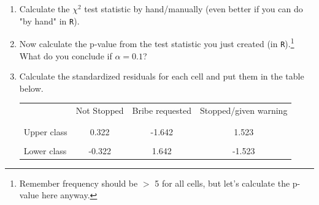 \documentclass[12pt,letterpaper]{article}
\begin{document}
\begin{enumerate}
	
	\item [(a)]
	Calculate the $\chi^2$ test statistic by hand/manually (even better if you can do "by hand" in \texttt{R}).\\

	
	
	
	
	\newpage
	\item [(b)]
	Now calculate the p-value from the test statistic you just created (in \texttt{R}).\footnote{Remember frequency should be $>$ 5 for all cells, but let's calculate the p-value here anyway.}  What do you conclude if $\alpha = 0.1$?\\
	
	
	
		
	\item [(c)] Calculate the standardized residuals for each cell and put them in the table below.
	
	
	
	\vspace{1cm}
	
	\begin{table}[h]
		\centering
		\begin{tabular}{l | c c c }
			& Not Stopped & Bribe requested & Stopped/given warning \\
			\\[-1.8ex] 
			\hline \\[-1.8ex]
			Upper class  & 0.322 & -1.642 &  1.523\\
			\\
			Lower class & -0.322 &  1.642 & -1.523 \\
			

\end{tabular}
\end{table}
\end{enumerate}
\end{document}
